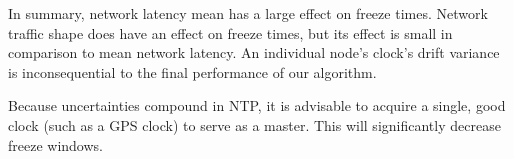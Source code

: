 
In summary, network latency mean has a large effect on freeze
times. Network traffic shape does have an effect on freeze times, but
its effect is small in comparison to mean network latency. An
individual node's clock's drift variance is inconsequential to the
final performance of our algorithm.

Because uncertainties compound in NTP, it is advisable to acquire a
single, good clock (such as a GPS clock) to serve as a master. This will significantly
decrease freeze windows.


